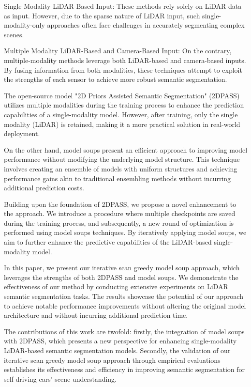 \documentclass[10pt,twocolumn,letterpaper]{article}
\begin{document}
Single Modality LiDAR-Based Input: These methods rely solely on LiDAR data as input. However, due to the sparse nature of LiDAR input, such single-modality-only approaches often face challenges in accurately segmenting complex scenes.

Multiple Modality LiDAR-Based and Camera-Based Input: On the contrary, multiple-modality methods leverage both LiDAR-based and camera-based inputs. By fusing information from both modalities, these techniques attempt to exploit the strengths of each sensor to achieve more robust semantic segmentation.

The open-source model "2D Priors Assisted Semantic Segmentation" (2DPASS) utilizes multiple modalities during the training process to enhance the prediction capabilities of a single-modality model. However, after training, only the single modality (LiDAR) is retained, making it a more practical solution in real-world deployment.

On the other hand, model soups present an efficient approach to improving model performance without modifying the underlying model structure. This technique involves creating an ensemble of models with uniform structures and achieving performance gains akin to traditional ensembling methods without incurring additional prediction costs.

Building upon the foundation of 2DPASS, we propose a novel enhancement to the approach. We introduce a procedure where multiple checkpoints are saved during the training process, and subsequently, a new round of optimization is performed using model soups techniques. By iteratively applying model soups, we aim to further enhance the predictive capabilities of the LiDAR-based single-modality model.

In this paper, we present our iterative scan greedy model soup approach, which leverages the strengths of both 2DPASS and model soups. We demonstrate the effectiveness of our method by conducting extensive experiments on LiDAR semantic segmentation tasks. The results showcase the potential of our approach to achieve notable performance improvements without altering the original model architecture and without incurring additional prediction time.

The contributions of this work are twofold: firstly, the integration of model soups with 2DPASS, which presents a new perspective for enhancing single-modality LiDAR-based semantic segmentation models. Secondly, the validation of our iterative scan greedy model soup approach through empirical evaluations establishes its effectiveness and efficiency in improving semantic segmentation for self-driving cars' scene understanding.
\end{document}
